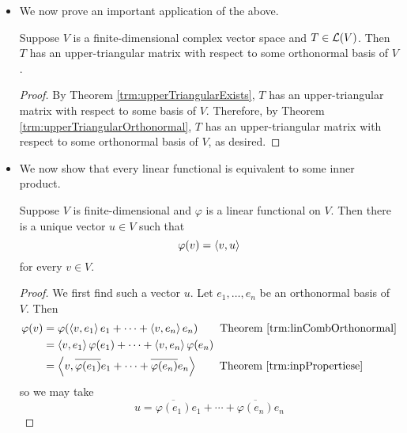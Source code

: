 \documentclass[../main.tex]{subfiles}
\begin{document}
\begin{itemize}
\begin{theorem}
\begin{proof}
        \end{proof}
    \end{theorem}
    \item We now prove an important application of the above.
    \begin{theorem}\label{trm:Schur}
        Suppose $V$ is a finite-dimensional complex vector space and $T\in\mathcal{L}(V)$. Then $T$ has an upper-triangular matrix with respect to some orthonormal basis of $V$.
        \begin{proof}
            By Theorem \ref{trm:upperTriangularExists}, $T$ has an upper-triangular matrix with respect to some basis of $V$. Therefore, by Theorem \ref{trm:upperTriangularOrthonormal}, $T$ has an upper-triangular matrix with respect to some orthonormal basis of $V$, as desired.
        \end{proof}
    \end{theorem}
    \item We now show that every linear functional is equivalent to some inner product.
    \begin{theorem}\label{trm:RieszRepresentationTheorem}
        Suppose $V$ is finite-dimensional and $\varphi$ is a linear functional on $V$. Then there is a unique vector $u\in V$ such that
        \begin{equation*}
            \varphi(v) = \left\langle{v},{u}\right\rangle
        \end{equation*}
        for every $v\in V$.
        \begin{proof}
            We first find such a vector $u$. Let $e_1,\dots,e_n$ be an orthonormal basis of $V$. Then
            \begin{align*}
                \varphi(v) &= \varphi(\inp{v}{e_1}e_1+\cdots+\inp{v}{e_n}e_n)\tag*{Theorem \ref{trm:linCombOrthonormal}}\\
                &= \inp{v}{e_1}\varphi(e_1)+\cdots+\inp{v}{e_n}\varphi(e_n)\\
                &= \inp{v}{\overline{\varphi(e_1)}e_1+\cdots+\overline{\varphi(e_n)}e_n}\tag*{Theorem \ref{trm:inpPropertiese}}
            \end{align*}
            so we may take
            \begin{equation*}
                u = \overline{\varphi(e_1)}e_1+\cdots+\overline{\varphi(e_n)}e_n

\end{equation*}
\end{proof}
\end{theorem}
\end{itemize}
\end{document}
